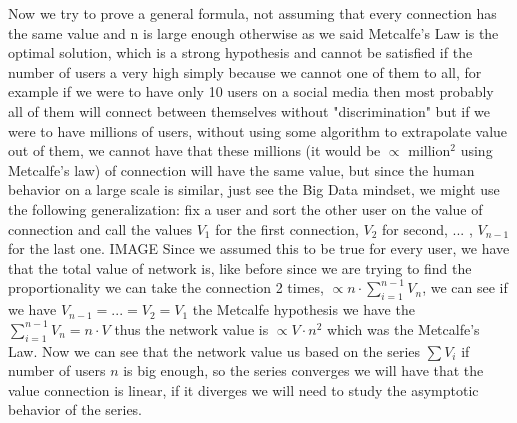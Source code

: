 \documentclass[12pt, a4page]{article}
\begin{document}
Now we try to prove a general formula, not assuming that every connection has the same value and n is large enough otherwise as we said Metcalfe's Law is the optimal solution, which is a strong hypothesis and cannot be satisfied if the number of users a very high simply because we cannot one of them to all, for example if we were to have only 10 users on a social media then most probably all of them will connect between themselves without "discrimination" but if we were to have millions of users, without using some algorithm to extrapolate value out of them, we cannot have that these millions (it would be $\propto$ million$^2$ using Metcalfe's law) of connection will have the same value, but since the human behavior on a large scale is similar, just see the Big Data mindset, we might use the following generalization:
fix a user and sort the other user on the value of connection and call the values $V_1$ for the first connection, $V_2$ for second, ... , $V_{n-1}$ for the last one.
\newline IMAGE \newline
Since we assumed this to be true for every user, we have that the total value of network is, like before since we are trying to find the proportionality we can take the connection 2 times, $\propto n \cdot \sum_{i=1}^{n-1} V_n$, we can see if we have $V_{n-1}=...=V_2=V_1$ the Metcalfe hypothesis we have the $ \sum_{i=1}^{n-1} V_n = n\cdot V$ thus the network value is $\propto V \cdot n^2$ which was the Metcalfe's Law.
Now we can see that the network value us based on the series $\sum V_i$ if number of users $n$ is big enough, so the series converges we will have that the value connection is linear, if it diverges we will need to study the asymptotic behavior of the series.


\end{document}
